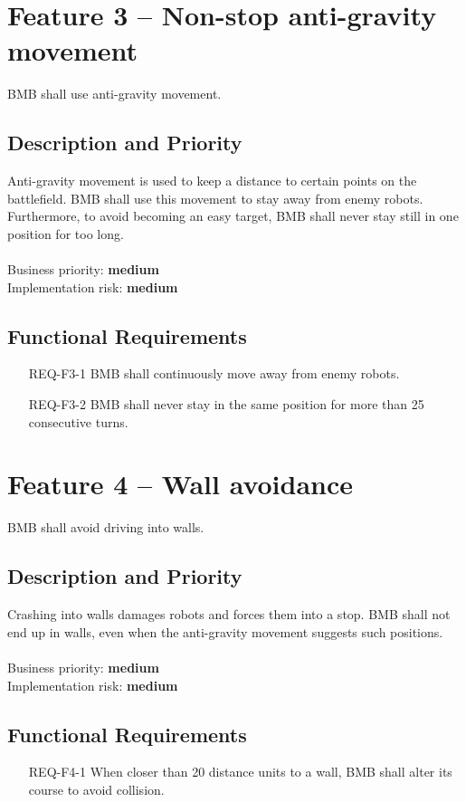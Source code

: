 \documentclass{scrreprt}
\begin{document}
\section{Feature 3 -- Non-stop anti-gravity movement}
BMB shall use anti-gravity movement.
	
\subsection{Description and Priority}
Anti-gravity movement is used to keep a distance to certain points on the battlefield. BMB shall use this movement to stay away from enemy robots. Furthermore, to avoid becoming an easy target, BMB shall never stay still in one position for too long.\\\\Business priority: \textbf{medium}\\
Implementation risk: \textbf{medium}

\subsection{Functional Requirements}
\begin{itemize}
\item[REQ-F3-1] BMB shall continuously move away from enemy robots.
\item[REQ-F3-2] BMB shall never stay in the same position for more than 25 consecutive turns.
\end{itemize}

\section{Feature 4 -- Wall avoidance}
BMB shall avoid driving into walls.

\subsection{Description and Priority}
Crashing into walls damages robots and forces them into a stop. BMB shall not end up in walls, even when the anti-gravity movement suggests such positions.\\\\Business priority: \textbf{medium}\\
Implementation risk: \textbf{medium}

\subsection{Functional Requirements}
\begin{itemize}
\item[REQ-F4-1] When closer than 20 distance units to a wall, BMB shall alter its course to avoid collision.
\end{itemize}
\end{document}
